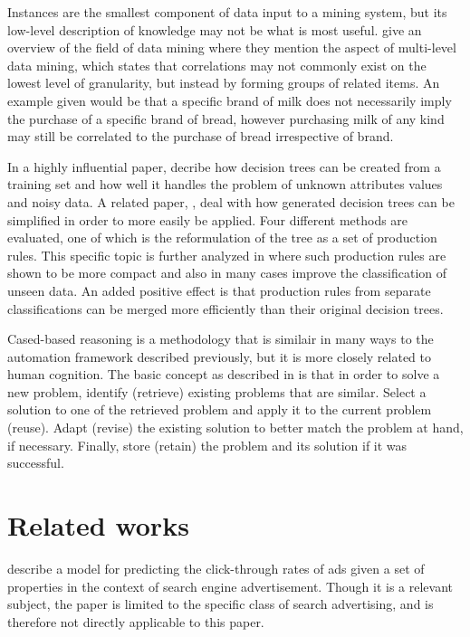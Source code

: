 \documentclass[11pt,a4paper]{report}
\begin{document}
Instances are the smallest component of data input to a mining system, but its low-level description of knowledge may not be what is most useful. \citet{Chen1996} give an overview of the field of data mining where they mention the aspect of multi-level data mining, which states that correlations may not commonly exist on the lowest level of granularity, but instead by forming groups of related items. An example given would be that a specific brand of milk does not necessarily imply the purchase of a specific brand of bread, however purchasing milk of any kind may still be correlated to the purchase of bread irrespective of brand.


In a highly influential paper, \citet{Quinlan1986} decribe how decision trees can be created from a training set and how well it handles the problem of unknown attributes values and noisy data. A related paper, \citet{Quinlan1987}, deal with how generated decision trees can be simplified in order to more easily be applied. Four different methods are evaluated, one of which is the reformulation of the tree as a set of production rules. This specific topic is further analyzed in \citet{Quinlan1987b} where such production rules are shown to be more compact and also in many cases improve the classification of unseen data. An added positive effect is that production rules from separate classifications can be merged more efficiently than their original decision trees.

Cased-based reasoning is a methodology that is similair in many ways to the automation framework described previously, but it is more closely related to human cognition. The basic concept as described in \citet{Watson1999} is that in order to solve a new problem, identify (retrieve) existing problems that are similar. Select a solution to one of the retrieved problem and apply it to the current problem (reuse). Adapt (revise) the existing solution to better match the problem at hand, if necessary. Finally, store (retain) the problem and its solution if it was successful.

\chapter{Related works}
\citet{Richardson2007} describe a model for predicting the click-through rates of ads given a set of properties in the context of search engine advertisement. Though it is a relevant subject, the paper is limited to the specific class of search advertising, and is therefore not directly applicable to this paper.
\end{document}
